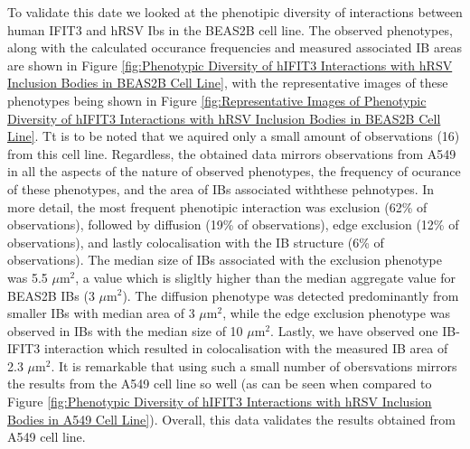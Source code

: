 To validate this date we looked at the phenotipic diversity of interactions between human IFIT3 and hRSV Ibs in the BEAS2B cell line. The observed phenotypes, along with the calculated occurance frequencies and measured associated IB areas are shown in Figure \ref{fig:Phenotypic Diversity of hIFIT3 Interactions with hRSV Inclusion Bodies in BEAS2B Cell Line}, with the representative images of these phenotypes being shown in Figure \ref{fig:Representative Images of Phenotypic Diversity of hIFIT3 Interactions with hRSV Inclusion Bodies in BEAS2B Cell Line}. Tt is to be noted that we aquired only a small amount of observations (16) from this cell line. Regardless, the obtained data mirrors observations from A549 in all the aspects of the nature of observed phenotypes, the frequency of ocurance of these phenotypes, and the area of IBs associated withthese pehnotypes. In more detail, the most frequent phenotipic interaction was exclusion (62\% of observations), followed by diffusion (19\% of observations), edge exclusion (12\% of observations), and lastly colocalisation with the IB structure (6\% of observations). The median size of IBs associated with the exclusion phenotype was 5.5 \(\mu \mbox{m}^2\), a value which is sligltly higher than the median aggregate value for BEAS2B IBs (3 \(\mu \mbox{m}^2\)). The diffusion phenotype was detected predominantly from smaller IBs with median area of 3 \(\mu \mbox{m}^2\), while the edge exclusion phenotype was observed in IBs with the median size of 10 \(\mu \mbox{m}^2\). Lastly, we have observed one IB-IFIT3 interaction which resulted in colocalisation with the measured IB area of 2.3 \(\mu \mbox{m}^2\). It is remarkable that using such a small number of obersvations mirrors the results from the A549 cell line so well (as can be seen when compared to Figure \ref{fig:Phenotypic Diversity of hIFIT3 Interactions with hRSV Inclusion Bodies in A549 Cell Line}). Overall, this data validates the results obtained from A549 cell line.

